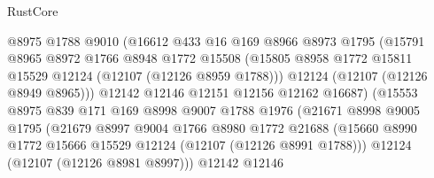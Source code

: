 \begin{lexlean}{RustCore}
\begin{coremodule}
                              @8975
                              @1788
                              @9010
                              (@16612
                                @433
                                @16
                                @169
                                @8966
                                @8973
                                @1795
                                (@15791
                                  @8965
                                  @8972
                                  @1766
                                  @8948
                                  @1772
                                  @15508
                                  (@15805
                                    @8958
                                    @1772
                                    @15811
                                    @15529
                                    @12124
                                    (@12107 (@12126 @8959 @1788)))
                                  @12124
                                  (@12107 (@12126 @8949 @8965)))
                                @12142
                                @12146
                                @12151
                                @12156
                                @12162
                                @16687)
                              (@15553
                                @8975
                                @839
                                @171
                                @169
                                @8998
                                @9007
                                @1788
                                @1976
                                (@21671
                                  @8998
                                  @9005
                                  @1795
                                  (@21679
                                    @8997
                                    @9004
                                    @1766
                                    @8980
                                    @1772
                                    @21688
                                    (@15660
                                      @8990
                                      @1772
                                      @15666
                                      @15529
                                      @12124
                                      (@12107 (@12126 @8991 @1788)))
                                    @12124
                                    (@12107 (@12126 @8981 @8997)))
                                  @12142
                                  @12146

\end{coremodule}
\end{lexlean}
